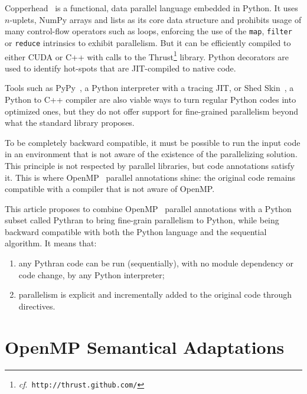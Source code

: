 \documentclass{llncs}
\begin{document}
Copperhead~\cite{copperhead2011} is a functional, data parallel language
embedded in Python. It uses $n$-uplets, NumPy arrays and lists as its core data
structure and prohibits usage of many control-flow operators such as loops,
enforcing the use of the \texttt{map}, \texttt{filter} or \texttt{reduce}
intrinsics to exhibit parallelism. But it can be efficiently compiled to either
CUDA or C++ with calls to the Thrust\footnote{\emph{cf}.\
\texttt{http://thrust.github.com/}} library. Python decorators are used to
identify hot-spots that are JIT-compiled to native code.

Tools such as PyPy~\cite{pypy2009}, a Python interpreter with a tracing JIT, or
Shed Skin~\cite{shedskin2006}, a Python to C++ compiler are also viable ways to
turn regular Python codes into optimized ones, but they do not offer support for
fine-grained parallelism beyond what the standard library proposes.

To be completely backward compatible, it must be possible to run the input code
in an environment that is not aware of the existence of the parallelizing
solution. This principle is not respected by parallel libraries, but code
annotations satisfy it. This is where OpenMP~\cite{openmp3.1} parallel
annotations shine: the original code remains compatible with a compiler that is
not aware of OpenMP.

This article proposes to combine OpenMP~\cite{openmp3.1} parallel annotations
with a Python subset called Pythran to bring fine-grain parallelism to Python,
while being backward compatible with both the Python language and the
sequential algorithm. It means that:
%
\begin{enumerate}
    \item any Pythran code can be run (sequentially), with no module dependency
        or code change, by any Python interpreter;
    \item parallelism is explicit and incrementally added to the original code
        through directives.
\end{enumerate}

\section{OpenMP Semantical Adaptations}\label{sec:python-openmp}
\end{document}
